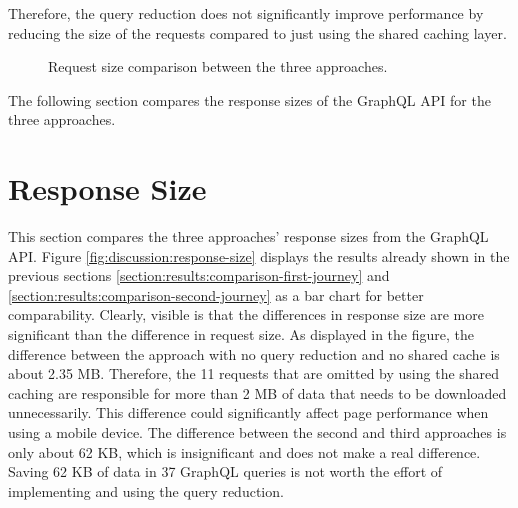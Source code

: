 \bigskip

\noindent Therefore, the query reduction does not significantly improve performance by reducing the size of the requests compared to just using the shared caching layer.

\begin{figure}[H]
  \centering
  \caption{Request size comparison between the three approaches.}\label{fig:discussion:request-size}
\end{figure}

\noindent The following section compares the response sizes of the GraphQL \ac{API} for the three approaches.

\section{Response Size}\label{section:discussion:response-size}

This section compares the three approaches' response sizes from the GraphQL API. Figure \ref{fig:discussion:response-size} displays the results already shown in the previous sections \ref{section:results:comparison-first-journey} and \ref{section:results:comparison-second-journey} as a bar chart for better comparability. Clearly, visible is that the differences in response size are more significant than the difference in request size. As displayed in the figure, the difference between the approach with no query reduction and no shared cache is about 2.35 MB. Therefore, the 11 requests that are omitted by using the shared caching are responsible for more than 2 MB of data that needs to be downloaded unnecessarily. This difference could significantly affect page performance when using a mobile device. The difference between the second and third approaches is only about 62 KB, which is insignificant and does not make a real difference. Saving 62 KB of data in 37 GraphQL queries is not worth the effort of implementing and using the query reduction. 

